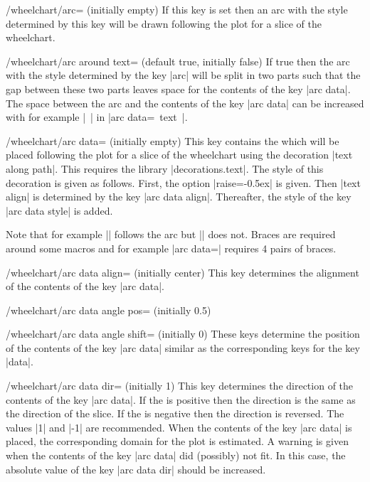 \documentclass[a4paper,english,dvipsnames]{ltxdoc}
\begin{document}
\begin{stylekey}{/wheelchart/arc= (initially \normalfont empty)}
If this key is set then an arc with the style determined by this key will be drawn following the plot for a slice of the wheelchart.
\end{stylekey}
\begin{key}{/wheelchart/arc around text= (default true, initially false)}
If true then the arc with the style determined by the key |arc| will be split in two parts such that the gap between these two parts leaves space for the contents of the key |arc data|. The space between the arc and the contents of the key |arc data| can be increased with for example |~| in |arc data=~text~|.
\end{key}
\begin{key}{/wheelchart/arc data= (initially \normalfont empty)}
This key contains the  which will be placed following the plot for a slice of the wheelchart using the decoration |text along path|. This requires the \tikzname{} library |decorations.text|. The style of this decoration is given as follows. First, the option |raise=-0.5ex| is given. Then |text align| is determined by the key |arc data align|. Thereafter, the style of the key |arc data style| is added.

Note that for example |\WCpercentage| follows the arc but |\WCperc| does not. Braces are required around some macros and for example |arc data={{{{\WCperc}}}}| requires 4 pairs of braces.
\end{key}
\begin{key}{/wheelchart/arc data align= (initially center)}
This key determines the alignment of the contents of the key |arc data|.
\end{key}
\begin{key}{/wheelchart/arc data angle pos= (initially 0.5)}
\end{key}
\begin{key}{/wheelchart/arc data angle shift= (initially 0)}
These keys determine the position of the contents of the key |arc data| similar as the corresponding keys for the key |data|.
\end{key}
\begin{key}{/wheelchart/arc data dir= (initially 1)}
This key determines the direction of the contents of the key |arc data|. If the  is positive then the direction is the same as the direction of the slice. If the  is negative then the direction is reversed. The values |1| and |-1| are recommended. When the contents of the key |arc data| is placed, the corresponding domain for the plot is estimated. A warning is given when the contents of the key |arc data| did (possibly) not fit. In this case, the absolute value of the key |arc data dir| should be increased.
\end{key}
\end{document}
